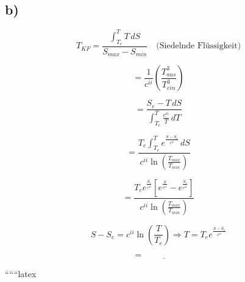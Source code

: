 

\subsection*{b)}

\[
T_{KF} = \frac{\int_{T_e}^{T} T \, dS}{S_{max} - S_{min}} \quad \text{(Siedelnde Flüssigkeit)}
\]

\[
= \frac{1}{c^{ii}} \left( \frac{T_{aus}^3}{T_{ein}^3} \right)
\]

\[
= \frac{S_e - T \, dS}{\int_{T_e}^{T} \frac{c^{ii}}{T} \, dT}
\]

\[
= \frac{T_e \int_{T_e}^{T} e^{\frac{S - S_e}{c^{ii}}} \, dS}{c^{ii} \ln \left( \frac{T_{max}}{T_{min}} \right)}
\]

\[
= \frac{T_e e^{\frac{S_e}{c^{ii}}} \left[ e^{\frac{S}{c^{ii}}} - e^{\frac{S_e}{c^{ii}}} \right]}{c^{ii} \ln \left( \frac{T_{max}}{T_{min}} \right)}
\]

\[
S - S_e = c^{ii} \ln \left( \frac{T}{T_e} \right) \Rightarrow T = T_e e^{\frac{S - S_e}{c^{ii}}}
\]

\[
= \underline{\hspace{2cm}}
\]

``````latex